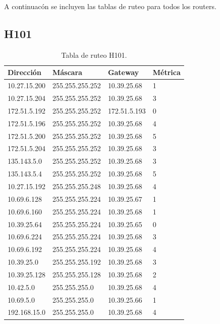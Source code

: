 \documentclass[12pt,titlepage]{article}
\begin{document}
A continuac\'on se incluyen las tablas de ruteo para todos los routers.

\subsection{H101}
\begin{table}
  \begin{center}
    \begin{tabular}{|l|l|l|l|}
      \hline
        \bf{Direcci\'on} & \bf{M\'ascara} & \bf{Gateway} & \bf{M\'etrica} \\
      \hline 
	10.27.15.200  & 255.255.255.252 & 10.39.25.68 & 1 \\
        10.27.15.204  & 255.255.255.252 & 10.39.25.68 & 3 \\
        172.51.5.192  & 255.255.255.252 & 172.51.5.193 & 0 \\
        172.51.5.196  & 255.255.255.252 & 10.39.25.68 & 4 \\
        172.51.5.200  & 255.255.255.252 & 10.39.25.68 & 5 \\
        172.51.5.204  & 255.255.255.252 & 10.39.25.68 & 3 \\
        135.143.5.0   & 255.255.255.252 & 10.39.25.68 & 3 \\
        135.143.5.4   & 255.255.255.252 & 10.39.25.68 & 5 \\ 	
	10.27.15.192  & 255.255.255.248 & 10.39.25.68 & 4 \\
	10.69.6.128   & 255.255.255.224 & 10.39.25.67 & 1 \\
        10.69.6.160   & 255.255.255.224 & 10.39.25.68 & 1 \\
	10.39.25.64   & 255.255.255.224 & 10.39.25.65 & 0 \\       
	10.69.6.224   & 255.255.255.224 & 10.39.25.68 & 3 \\
	10.69.6.192   & 255.255.255.224 & 10.39.25.68 & 4 \\	
	10.39.25.0    & 255.255.255.192 & 10.39.25.68 & 3 \\
	10.39.25.128  & 255.255.255.128 & 10.39.25.68 & 2 \\
	10.42.5.0     & 255.255.255.0 & 10.39.25.68 & 4 \\
        10.69.5.0     & 255.255.255.0 & 10.39.25.66 & 1 \\
        192.168.15.0  & 255.255.255.0 & 10.39.25.68 & 4 \\  
    \hline
    \end{tabular} \\
  \end{center}
  \caption{Tabla de ruteo H101.}
\end{table}
\FloatBarrier
\end{document}
